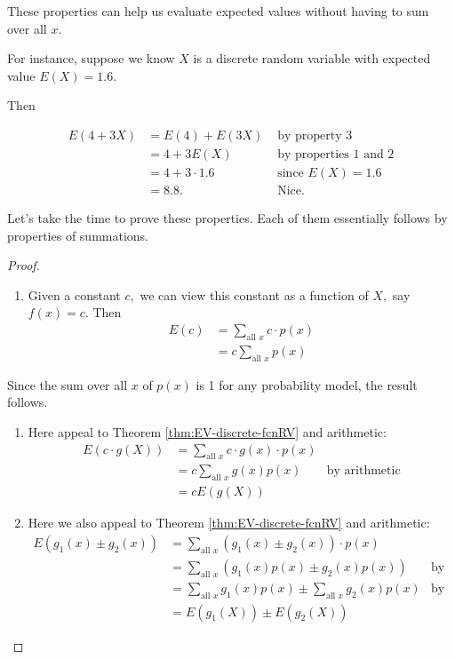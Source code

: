 \documentclass[
]{book}
\providecommand{\tightlist}{%
  \setlength{\itemsep}{0pt}\setlength{\parskip}{0pt}}
\theoremstyle{definition}
\theoremstyle{definition}
\theoremstyle{definition}
\theoremstyle{definition}
\theoremstyle{remark}
\begin{document}
These properties can help us evaluate expected values without having to sum over all \(x\).

For instance, suppose we know \(X\) is a discrete random variable with expected value \(E(X) = 1.6\).

Then

\begin{align*}
E(4+3X) &= E(4) + E(3X) &\text{ by property 3} \\
        &= 4 + 3E(X) &\text{ by properties 1 and 2}\\
        &= 4 + 3 \cdot 1.6 &\text { since }E(X) = 1.6 \\
        &= 8.8. &\text{ Nice.}
\end{align*}

Let's take the time to prove these properties. Each of them essentially follows by properties of summations.

\begin{proof}
\leavevmode

\begin{enumerate}
\def\labelenumi{\arabic{enumi}.}
\tightlist
\item
  Given a constant \(c,\) we can view this constant as a function of \(X,\) say \(f(x) = c\). Then
  \begin{align*}
  E(c) &= \sum_{\text{all }x} c \cdot p(x) \\
  &= c \sum_{\text{all }x} p(x)
  \end{align*}
\end{enumerate}

Since the sum over all \(x\) of \(p(x)\) is 1 for any probability model, the result follows.

\begin{enumerate}
\def\labelenumi{\arabic{enumi}.}
\setcounter{enumi}{1}
\item
  Here appeal to Theorem \ref{thm:EV-discrete-fcnRV} and arithmetic:
  \begin{align*}
  E(c\cdot g(X)) &= \sum_{\text{all }x} c \cdot g(x) \cdot p(x) & \\
  &= c \sum_{\text{all }x} g(x) p(x) &\text{by arithmetic}\\
  &= c E(g(X)) & 
  \end{align*}
\item
  Here we also appeal to Theorem \ref{thm:EV-discrete-fcnRV} and arithmetic:
  \begin{align*}
  E(g_1(x) \pm g_2(x)) &= \sum_{\text{all }x} (g_1(x) \pm g_2(x))\cdot p(x) &\\
  &= \sum_{\text{all }x} (g_1(x) p(x) \pm g_2(x) p(x)) &\text{by arithmetic}\\
  &= \sum_{\text{all }x} g_1(x) p(x) \pm \sum_{\text{all }x} g_2(x) p(x)  &\text{by arithmetic}\\
  &= E(g_1(X)) \pm E(g_2(X)) & 
  \end{align*}
\end{enumerate}

\end{proof}
\end{document}
